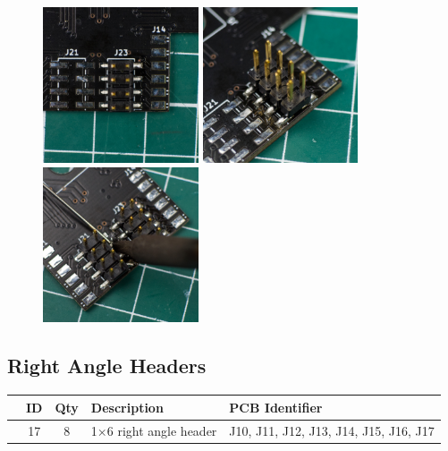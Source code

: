 \documentclass[12pt, a4paper]{article}
\newcommand{\checkbox}[1]{\CheckBox[backgroundcolor=0.86 0.828 0.71, name=#1]{}}
\begin{document}
\begin{figure}[H]
    \centering
    \includegraphics[width=46mm]{images/section_2-1_single.jpg}
    \hspace{2mm}
    \includegraphics[width=46mm]{images/section_2-1_full.jpg}
    \hspace{2mm}
    \includegraphics[width=46mm]{images/section_2-1_top.jpg}
\end{figure}

\subsection{Right Angle Headers}

\begin{center}
    \small
    \setlength\extrarowheight{8pt}
    \begin{tabularx}{\textwidth}{|c|c|c|X|l|}
        \hline\rowcolor{lightgray} & ID & Qty & Description & PCB Identifier\\
        \hline\checkbox{ga} & 17 & 8 & 1×6 right angle header & J10, J11, J12, J13, J14, J15, J16, J17\\
        \hline
    \end{tabularx}
\end{center}
\end{document}
